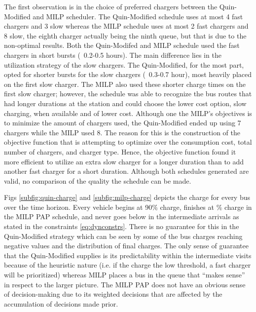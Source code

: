 The first observation is in the choice of preferred chargers between the Quin-Modified and MILP scheduler. The
Quin-Modified schedule uses at most 4 fast chargers and 3 slow whereas the MILP schedule uses at most 2 fast chargers
and 8 slow, the eighth charger actually being the ninth queue, but that is due to the non-optimal results. Both the
Quin-Modifed and MILP schedule used the fast chargers in short bursts (~0.2-0.5 hours). The main difference lies in the
utilization strategy of the slow chargers. The Quin-Modified, for the most part, opted for shorter bursts for the slow
chargers (~0.3-0.7 hour), most heavily placed on the first slow charger. The MILP also used these shorter charge times
on the first slow charger; however, the schedule was able to recognize the bus routes that had longer durations at the
station and could choose the lower cost option, slow charging, when available and of lower cost. Although one the MILP's
objectives is to minimize the amount of chargers used, the Quin-Modified ended up using 7 chargers while the MILP used
8. The reason for this is the construction of the objective function that is attempting to optimize over the consumption
cost, total number of chargers, and charger type. Hence, the objective function found it more efficient to utilize an
extra slow charger for a longer duration than to add another fast charger for a short duration. Although both schedules
generated are valid, no comparison of the quality the schedule can be made.

Figs \ref{subfig:quin-charge} and \ref{subfig:milp-charge} depicts the charge for every bus over the time horizon. Every
vehicle begins at 90\% charge, finishes at \% charge in the MILP PAP schedule, and never goes
below \mincharge in the intermediate arrivals as stated in the constraints \eqref{eq:dynconstrs}. There is no guarantee
for this in the Quin-Modified strategy which can be seen by some of the bus charges reaching negative values and the
distribution of final charges. The only sense of guarantee that the Quin-Modified supplies is its predictability within
the intermediate visits because of the heuristic nature (i.e. if the charge the low threshold, a fast charger will be
prioritized) whereas MILP places a bus in the queue that ``makes sense'' in respect to the larger picture. The MILP PAP
does not have an obvious sense of decision-making due to its weighted decisions that are affected by the accumulation of
decisions made prior.

